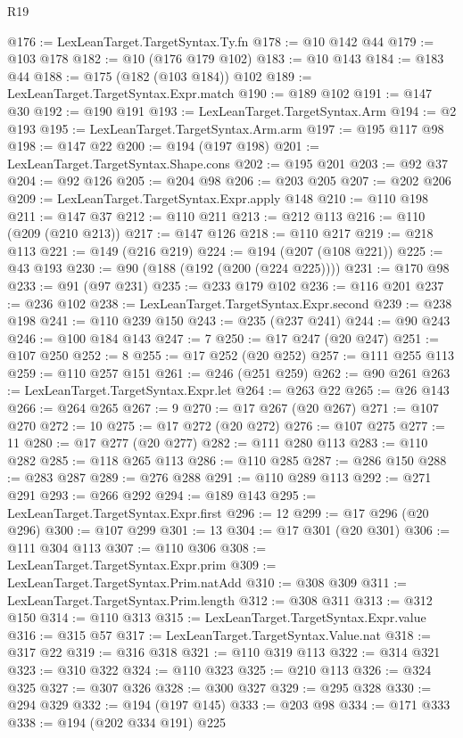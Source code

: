 \begin{lexlean}{R19}
\begin{coremodule}
@176 := LexLeanTarget.TargetSyntax.Ty.fn
@178 := @10 @142 @44
@179 := @103 @178
@182 := @10 (@176 @179 @102)
@183 := @10 @143
@184 := @183 @44
@188 := @175 (@182 (@103 @184)) @102
@189 := LexLeanTarget.TargetSyntax.Expr.match
@190 := @189 @102
@191 := @147 @30
@192 := @190 @191
@193 := LexLeanTarget.TargetSyntax.Arm
@194 := @2 @193
@195 := LexLeanTarget.TargetSyntax.Arm.arm
@197 := @195 @117 @98
@198 := @147 @22
@200 := @194 (@197 @198)
@201 := LexLeanTarget.TargetSyntax.Shape.cons
@202 := @195 @201
@203 := @92 @37
@204 := @92 @126
@205 := @204 @98
@206 := @203 @205
@207 := @202 @206
@209 := LexLeanTarget.TargetSyntax.Expr.apply @148
@210 := @110 @198
@211 := @147 @37
@212 := @110 @211
@213 := @212 @113
@216 := @110 (@209 (@210 @213))
@217 := @147 @126
@218 := @110 @217
@219 := @218 @113
@221 := @149 (@216 @219)
@224 := @194 (@207 (@108 @221))
@225 := @43 @193
@230 := @90 (@188 (@192 (@200 (@224 @225))))
@231 := @170 @98
@233 := @91 (@97 @231)
@235 := @233 @179 @102
@236 := @116 @201
@237 := @236 @102
@238 := LexLeanTarget.TargetSyntax.Expr.second
@239 := @238 @198
@241 := @110 @239 @150
@243 := @235 (@237 @241)
@244 := @90 @243
@246 := @100 @184 @143
@247 := 7
@250 := @17 @247 (@20 @247)
@251 := @107 @250
@252 := 8
@255 := @17 @252 (@20 @252)
@257 := @111 @255 @113
@259 := @110 @257 @151
@261 := @246 (@251 @259)
@262 := @90 @261
@263 := LexLeanTarget.TargetSyntax.Expr.let
@264 := @263 @22
@265 := @26 @143
@266 := @264 @265
@267 := 9
@270 := @17 @267 (@20 @267)
@271 := @107 @270
@272 := 10
@275 := @17 @272 (@20 @272)
@276 := @107 @275
@277 := 11
@280 := @17 @277 (@20 @277)
@282 := @111 @280 @113
@283 := @110 @282
@285 := @118 @265 @113
@286 := @110 @285
@287 := @286 @150
@288 := @283 @287
@289 := @276 @288
@291 := @110 @289 @113
@292 := @271 @291
@293 := @266 @292
@294 := @189 @143
@295 := LexLeanTarget.TargetSyntax.Expr.first
@296 := 12
@299 := @17 @296 (@20 @296)
@300 := @107 @299
@301 := 13
@304 := @17 @301 (@20 @301)
@306 := @111 @304 @113
@307 := @110 @306
@308 := LexLeanTarget.TargetSyntax.Expr.prim
@309 := LexLeanTarget.TargetSyntax.Prim.natAdd
@310 := @308 @309
@311 := LexLeanTarget.TargetSyntax.Prim.length
@312 := @308 @311
@313 := @312 @150
@314 := @110 @313
@315 := LexLeanTarget.TargetSyntax.Expr.value
@316 := @315 @57
@317 := LexLeanTarget.TargetSyntax.Value.nat
@318 := @317 @22
@319 := @316 @318
@321 := @110 @319 @113
@322 := @314 @321
@323 := @310 @322
@324 := @110 @323
@325 := @210 @113
@326 := @324 @325
@327 := @307 @326
@328 := @300 @327
@329 := @295 @328
@330 := @294 @329
@332 := @194 (@197 @145)
@333 := @203 @98
@334 := @171 @333
@338 := @194 (@202 @334 @191) @225

\end{coremodule}
\end{lexlean}

